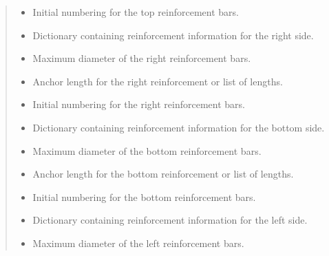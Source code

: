 \documentclass[a4paper,10pt,english]{sphinxmanual}
\begin{document}
\begin{fulllineitems}
\begin{quote}
\begin{description}
\begin{itemize}
\item {} 
\sphinxAtStartPar
{} \textendash{} Initial numbering for the top reinforcement bars.

\item {} 
\sphinxAtStartPar
{} \textendash{} Dictionary containing reinforcement information for the right side.

\item {} 
\sphinxAtStartPar
{} \textendash{} Maximum diameter of the right reinforcement bars.

\item {} 
\sphinxAtStartPar
{} \textendash{} Anchor length for the right reinforcement or list of lengths.

\item {} 
\sphinxAtStartPar
{} \textendash{} Initial numbering for the right reinforcement bars.

\item {} 
\sphinxAtStartPar
{} \textendash{} Dictionary containing reinforcement information for the bottom side.

\item {} 
\sphinxAtStartPar
{} \textendash{} Maximum diameter of the bottom reinforcement bars.

\item {} 
\sphinxAtStartPar
{} \textendash{} Anchor length for the bottom reinforcement or list of lengths.

\item {} 
\sphinxAtStartPar
{} \textendash{} Initial numbering for the bottom reinforcement bars.

\item {} 
\sphinxAtStartPar
{} \textendash{} Dictionary containing reinforcement information for the left side.

\item {} 
\sphinxAtStartPar
{} \textendash{} Maximum diameter of the left reinforcement bars.


\end{itemize}
\end{description}
\end{quote}
\end{fulllineitems}
\end{document}
